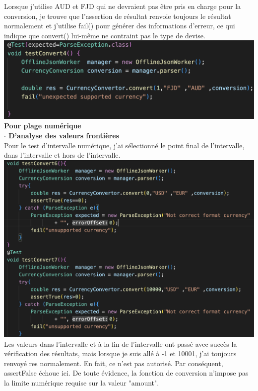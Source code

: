 \documentclass{article}
\begin{document}
Lorsque j'utilise AUD et FJD qui ne devraient pas être pris en charge pour la conversion, je trouve que l'assertion de résultat renvoie toujours le résultat normalement et j'utilise fail() pour générer des informations d'erreur, ce qui indique que convert() lui-même ne contraint pas le type de devise.\\
\includegraphics[scale=0.3]{G3.png}\\

\textbf{Pour plage numérique}\\

\textbf{$\cdot$ D’analyse des valeurs frontières}\\

Pour le test d'intervalle numérique, j'ai sélectionné le point final de l'intervalle, dans l'intervalle et hors de l'intervalle.\\
\includegraphics[scale=0.3]{G4.png} \\

Les valeurs dans l'intervalle et à la fin de l'intervalle ont passé avec succès la vérification des résultats, mais lorsque je suis allé à -1 et 10001, j'ai toujours renvoyé res normalement. En fait, ce n'est pas autorisé. Par conséquent, assertFalse échoue ici. De toute évidence, la fonction de conversion n'impose pas la limite numérique requise sur la valeur "amount".\\
\end{document}
